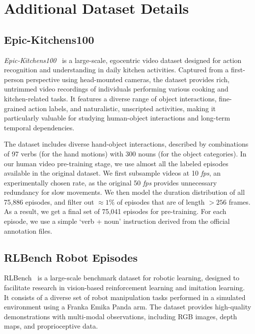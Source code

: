 \section{Additional Dataset Details}
\label{supp:our:datasets}

\subsection{Epic-Kitchens100}
\textit{Epic-Kitchens100}~\cite{Damen2018EPICKITCHENS} is a large-scale, egocentric video dataset designed for action recognition and understanding in daily kitchen activities. Captured from a first-person perspective using head-mounted cameras, the dataset provides rich, untrimmed video recordings of individuals performing various cooking and kitchen-related tasks. It features a diverse range of object interactions, fine-grained action labels, and naturalistic, unscripted activities, making it particularly valuable for studying human-object interactions and long-term temporal dependencies. 

The dataset includes diverse hand-object interactions, described by combinations of 97 verbs (for the hand motions) with 300 nouns (for the object categories). In our human video pre-training stage, we use almost all the labeled episodes available in the original dataset. We first subsample videos at 10 \textit{fps}, an experimentally chosen rate, as the original 50 \textit{fps} provides unnecessary redundancy for slow movements. We then model the duration distribution of all 75,886 episodes, and filter out $\approx1\%$ of episodes that are of length $> 256$ frames. As a result, we get a final set of 75,041 episodes for pre-training. For each episode, we use a simple `verb + noun' instruction derived from the official annotation files.

\subsection{RLBench Robot Episodes}
RLBench~\cite{james2020rlbench} is a large-scale benchmark dataset for robotic learning, designed to facilitate research in vision-based reinforcement learning and imitation learning. It consists of a diverse set of robot manipulation tasks performed in a simulated environment using a Franka Emika Panda arm. The dataset provides high-quality demonstrations with multi-modal observations, including RGB images, depth maps, and proprioceptive data. 

